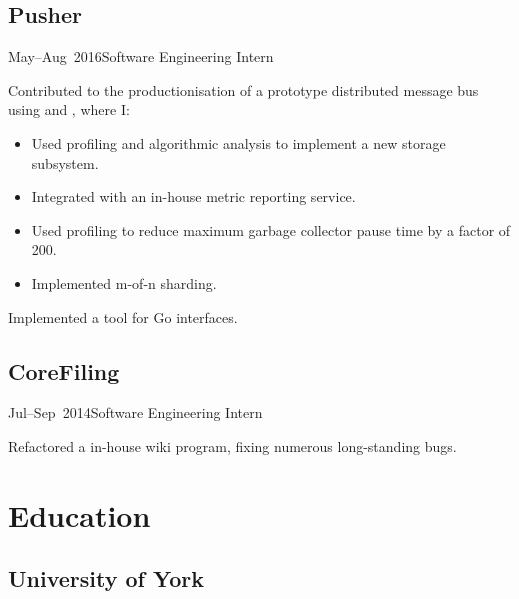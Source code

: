\documentclass[a4paper]{barrucadu-cv}
\newcommand{\range}[2]{#1–#2}
\begin{document}
\subsection{Pusher}

\begin{cventry}{\range{May}{Aug}~2016}{Software Engineering Intern}
  \begin{tightitemize}
  \item Contributed to the productionisation of a prototype
    distributed message bus using  and , where I:

    \begin{itemize}
    \item Used profiling and algorithmic analysis to implement a new
      storage subsystem.
    \item Integrated with an in-house metric reporting service.
    \item Used profiling to reduce maximum garbage collector pause
      time by a factor of 200.
    \item Implemented m-of-n sharding.
    \end{itemize}

  \item Implemented a tool for  Go interfaces.
  \end{tightitemize}
\end{cventry}

\subsection{CoreFiling}

\begin{cventry}{\range{Jul}{Sep}~2014}{Software Engineering Intern}
  \begin{tightitemize}
  \item Refactored a  in-house wiki program, fixing
    numerous long-standing bugs.
  \end{tightitemize}
\end{cventry}

\section{Education}

\subsection{University of York}
\end{document}
